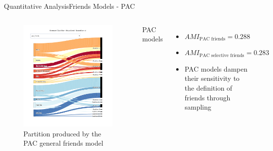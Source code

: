 \documentclass[xcolor=dvipsnames]{beamer}
\newcommand{\AMI}{\mathit{AMI}}
\begin{document}
\begin{frame}{Quantitative Analysis}{Friends Models - PAC}
  \small
  \begin{columns}
  \begin{figure}
    \includegraphics[width=\linewidth]{friends_pac}
    \caption[Partition visualization: PAC general friends model]{Partition produced by the PAC general friends model}
  \end{figure}
  PAC models
  \begin{itemize}
    \item $\AMI_{\text{PAC friends}} = 0.288$
    \item $\AMI_{\text{PAC selective friends}} = 0.283$
    \item PAC models dampen their sensitivity to the definition of friends through sampling
  \end{itemize}
  \end{columns}
\end{frame}
\end{document}
